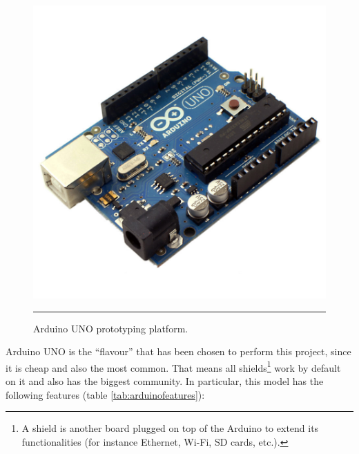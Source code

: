 \begin{figure}[htbp]
    \centering
    \includegraphics[scale=0.2]{./Figures/auno.jpg}
        \rule{35em}{0.5pt}
        \caption[Arduino UNO]{Arduino UNO prototyping platform.}
    \label{fig:ArduinoUNO}
\end{figure}

Arduino UNO is the ``flavour'' that has been chosen to perform this project, since it is cheap and also the most common. That means all shields\footnote{A shield is another board plugged on top of the Arduino to extend its functionalities (for instance Ethernet, Wi-Fi, SD cards, etc.).}  work by default on it and also has the biggest community. In particular, this model has the following features (table \ref{tab:arduinofeatures}):
\\

